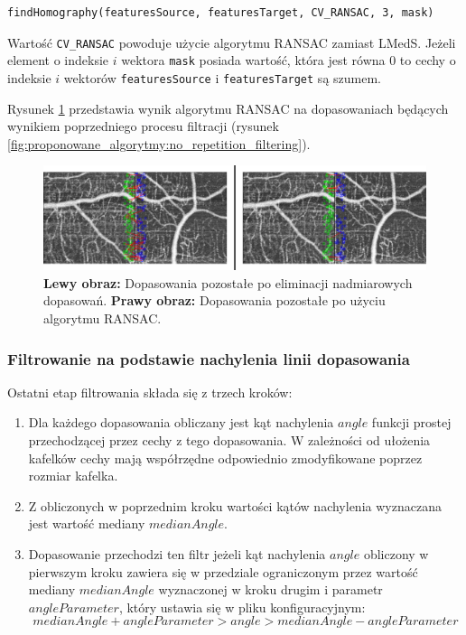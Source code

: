 \begin{verbatim}
findHomography(featuresSource, featuresTarget, CV_RANSAC, 3, mask)
\end{verbatim}

Wartość \texttt{CV\_RANSAC} powoduje użycie algorytmu RANSAC zamiast LMedS. Jeżeli element o indeksie $i$ wektora \texttt{mask} posiada wartość, która jest równa $0$ to cechy o indeksie $i$ wektorów \texttt{featuresSource} i \texttt{featuresTarget} są szumem.

Rysunek \ref{fig:proponowane_algorytmy:ransac_filter} przedstawia wynik algorytmu RANSAC na dopasowaniach będących wynikiem poprzedniego procesu filtracji (rysunek \ref{fig:proponowane_algorytmy:no_repetition_filtering}).

\begin{figure}[H]
  \centering
  \includegraphics[width=\textwidth]{gfx/ransac_filter}
  \caption{\textbf{Lewy obraz:} Dopasowania pozostałe po eliminacji nadmiarowych dopasowań. \textbf{Prawy obraz:} Dopasowania pozostałe po użyciu algorytmu RANSAC.}
  \label{fig:proponowane_algorytmy:ransac_filter}
\end{figure}

\subsubsection{Filtrowanie na podstawie nachylenia linii dopasowania}
\label{sec:proponowane_algorytmy:slope_filtering}

Ostatni etap filtrowania składa się z trzech kroków:

\begin{enumerate}
\item Dla każdego dopasowania obliczany jest kąt nachylenia $angle$ funkcji prostej przechodzącej przez cechy z tego dopasowania. W zależności od ułożenia kafelków cechy mają współrzędne odpowiednio zmodyfikowane poprzez rozmiar kafelka.
\item Z obliczonych w poprzednim kroku wartości kątów nachylenia wyznaczana jest wartość mediany $medianAngle$.
\item Dopasowanie przechodzi ten filtr jeżeli kąt nachylenia $angle$ obliczony w pierwszym kroku zawiera się w przedziale ograniczonym przez wartość mediany $medianAngle$ wyznaczonej w kroku drugim i parametr $angleParameter$, który ustawia się w pliku konfiguracyjnym:
\begin{equation}
medianAngle + angleParameter > angle > medianAngle - angleParameter
\label{eq:angle}
\end{equation}
\end{enumerate}


